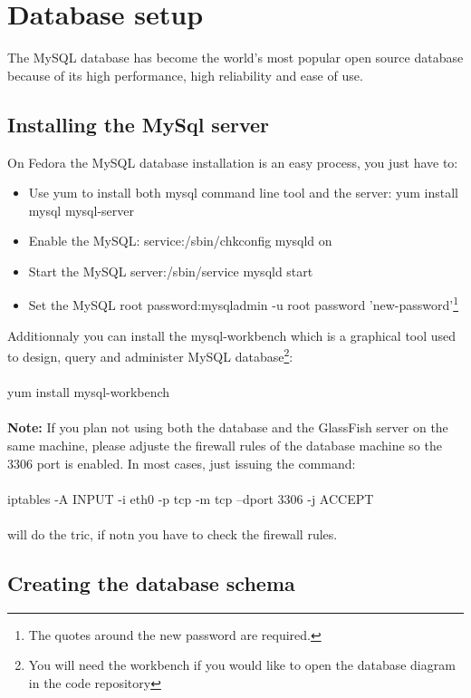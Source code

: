 
\section{Database setup}
The MySQL database has become the world's most popular open source database
because of its high performance, high reliability and ease of use.
\subsection{Installing the MySql server}
On Fedora the MySQL database installation is an easy process, you just have to:
\begin{itemize}
  \item Use yum to install both mysql command line tool and the server:
  {\Console yum install mysql mysql-server}
  \item Enable the MySQL: {\Console service:/sbin/chkconfig mysqld on}
  \item Start the MySQL server:{\Console /sbin/service mysqld start}
  \item Set the MySQL root password:{\Console mysqladmin -u root password
  'new-password'}\footnote{The quotes around the new password are required.}
\end{itemize}

Additionnaly you can install the mysql-workbench which is a graphical tool used
to design, query and administer MySQL database\footnote{You will need the
workbench if you would like to open the database diagram in the code
repository}:
\\\\
{\Console yum install mysql-workbench}
\\\\
\textbf{Note:} If you plan not using both the database and the GlassFish server
on the same machine, please adjuste the firewall rules of the database machine
so the 3306 port is enabled. In most cases, just issuing the command:
\\\\
{\Console iptables -A INPUT -i eth0 -p tcp -m tcp --dport 3306 -j ACCEPT}
\\\\
will do the tric, if notn you have to check the firewall rules.
\subsection{Creating the database schema}
